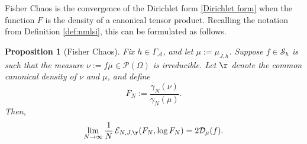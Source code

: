 \documentclass[11pt,reqno]{amsart}
\numberwithin{equation}{section}
\numberwithin{figure}{section}
\newtheorem{proposition}[theorem]{Proposition}
\newcommand{\1}{\mathds{1}}
\let\G=\Gamma
\newcommand{\cA}{\ensuremath{\mathcal A}}
\newcommand{\cS}{\ensuremath{\mathcal S}}
\begin{document}

Fisher Chaos is the convergence of the Dirichlet form \eqref{Dirichlet form} when the function $F$ is the density of a canonical tensor product. Recalling the notation from Definition \ref{def:nmlsi}, this can be formulated as follows. 
\begin{proposition}[Fisher Chaos]\label{Fisher Chaos}
    Fix $h\in\G_\cA$, and let $\mu:=\mu_{J,h}$. Suppose  $f\in\cS_h$ is such that the  measure \(\nu := f \mu \in \mathcal{P}(\Omega)\) is irreducible. 
        Let $\r$ denote the common canonical density of $\nu$ and $\mu$, and define
    \begin{equation}\label{observable approximat}
        F_N := \frac{\gamma_N(\nu)}{\gamma_N(\mu)}.
    \end{equation}
    Then,
    \begin{equation}\label{observable approximat2}
    \lim_{N \to \infty} \frac{1}{N}\, \mathcal{E}_{N, J,\r}(F_N, \log F_N) = 2\mathcal{D}_\mu(f).
    \end{equation}
\end{proposition}
\end{document}

